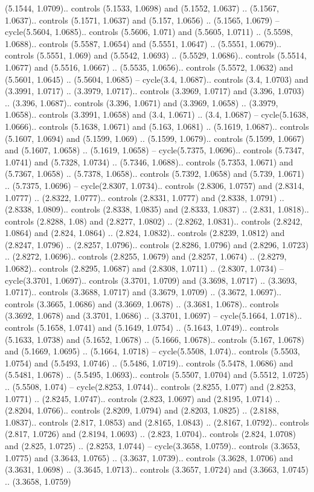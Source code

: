 (5.1544, 1.0709).. controls (5.1533, 1.0698) and (5.1552, 1.0637) .. (5.1567, 1.0637).. controls (5.1571, 1.0637) and (5.157, 1.0656) .. (5.1565, 1.0679) -- cycle(5.5604, 1.0685).. controls (5.5606, 1.071) and (5.5605, 1.0711) .. (5.5598, 1.0688).. controls (5.5587, 1.0654) and (5.5551, 1.0647) .. (5.5551, 1.0679).. controls (5.5551, 1.069) and (5.5542, 1.0693) .. (5.5529, 1.0686).. controls (5.5514, 1.0677) and (5.5516, 1.0667) .. (5.5535, 1.0656).. controls (5.5572, 1.0632) and (5.5601, 1.0645) .. (5.5604, 1.0685) -- cycle(3.4, 1.0687).. controls (3.4, 1.0703) and (3.3991, 1.0717) .. (3.3979, 1.0717).. controls (3.3969, 1.0717) and (3.396, 1.0703) .. (3.396, 1.0687).. controls (3.396, 1.0671) and (3.3969, 1.0658) .. (3.3979, 1.0658).. controls (3.3991, 1.0658) and (3.4, 1.0671) .. (3.4, 1.0687) -- cycle(5.1638, 1.0666).. controls (5.1638, 1.0671) and (5.163, 1.0681) .. (5.1619, 1.0687).. controls (5.1607, 1.0694) and (5.1599, 1.069) .. (5.1599, 1.0679).. controls (5.1599, 1.0667) and (5.1607, 1.0658) .. (5.1619, 1.0658) -- cycle(5.7375, 1.0696).. controls (5.7347, 1.0741) and (5.7328, 1.0734) .. (5.7346, 1.0688).. controls (5.7353, 1.0671) and (5.7367, 1.0658) .. (5.7378, 1.0658).. controls (5.7392, 1.0658) and (5.739, 1.0671) .. (5.7375, 1.0696) -- cycle(2.8307, 1.0734).. controls (2.8306, 1.0757) and (2.8314, 1.0777) .. (2.8322, 1.0777).. controls (2.8331, 1.0777) and (2.8338, 1.0791) .. (2.8338, 1.0809).. controls (2.8338, 1.0835) and (2.8333, 1.0837) .. (2.831, 1.0818).. controls (2.8288, 1.08) and (2.8277, 1.0802) .. (2.8262, 1.0831).. controls (2.8242, 1.0864) and (2.824, 1.0864) .. (2.824, 1.0832).. controls (2.8239, 1.0812) and (2.8247, 1.0796) .. (2.8257, 1.0796).. controls (2.8286, 1.0796) and (2.8296, 1.0723) .. (2.8272, 1.0696).. controls (2.8255, 1.0679) and (2.8257, 1.0674) .. (2.8279, 1.0682).. controls (2.8295, 1.0687) and (2.8308, 1.0711) .. (2.8307, 1.0734) -- cycle(3.3701, 1.0697).. controls (3.3701, 1.0709) and (3.3698, 1.0717) .. (3.3693, 1.0717).. controls (3.3688, 1.0717) and (3.3679, 1.0709) .. (3.3672, 1.0697).. controls (3.3665, 1.0686) and (3.3669, 1.0678) .. (3.3681, 1.0678).. controls (3.3692, 1.0678) and (3.3701, 1.0686) .. (3.3701, 1.0697) -- cycle(5.1664, 1.0718).. controls (5.1658, 1.0741) and (5.1649, 1.0754) .. (5.1643, 1.0749).. controls (5.1633, 1.0738) and (5.1652, 1.0678) .. (5.1666, 1.0678).. controls (5.167, 1.0678) and (5.1669, 1.0695) .. (5.1664, 1.0718) -- cycle(5.5508, 1.074).. controls (5.5503, 1.0754) and (5.5493, 1.0746) .. (5.5486, 1.0719).. controls (5.5478, 1.0686) and (5.5481, 1.0678) .. (5.5495, 1.0693).. controls (5.5507, 1.0704) and (5.5512, 1.0725) .. (5.5508, 1.074) -- cycle(2.8253, 1.0744).. controls (2.8255, 1.077) and (2.8253, 1.0771) .. (2.8245, 1.0747).. controls (2.823, 1.0697) and (2.8195, 1.0714) .. (2.8204, 1.0766).. controls (2.8209, 1.0794) and (2.8203, 1.0825) .. (2.8188, 1.0837).. controls (2.817, 1.0853) and (2.8165, 1.0843) .. (2.8167, 1.0792).. controls (2.817, 1.0726) and (2.8194, 1.0693) .. (2.823, 1.0704).. controls (2.824, 1.0708) and (2.825, 1.0725) .. (2.8253, 1.0744) -- cycle(3.3658, 1.0759).. controls (3.3653, 1.0775) and (3.3643, 1.0765) .. (3.3637, 1.0739).. controls (3.3628, 1.0706) and (3.3631, 1.0698) .. (3.3645, 1.0713).. controls (3.3657, 1.0724) and (3.3663, 1.0745) .. (3.3658, 1.0759) 